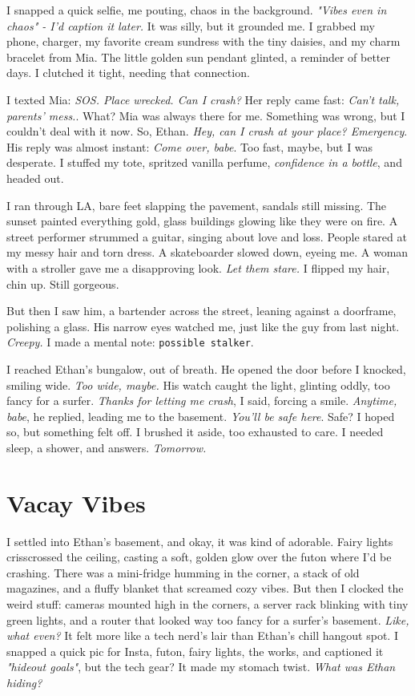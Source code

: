 \documentclass[12pt,oneside]{book} %
\newcommand{\note}[1]{\texttt{#1}}
\begin{document}
I snapped a quick selfie, me pouting, chaos in the background. \textit{"Vibes even in chaos" - I’d caption it later.} It was silly, but it grounded me. I grabbed my phone, charger, my favorite cream sundress with the tiny daisies, and my charm bracelet from Mia. The little golden sun pendant glinted, a reminder of better days. I clutched it tight, needing that connection.

I texted Mia: \textit{SOS. Place wrecked. Can I crash?} Her reply came fast: \textit{Can’t talk, parents’ mess.}. What? Mia was always there for me. Something was wrong, but I couldn’t deal with it now. So, Ethan. \textit{Hey, can I crash at your place? Emergency}. His reply was almost instant: \textit{Come over, babe}. Too fast, maybe, but I was desperate. I stuffed my tote, spritzed vanilla perfume, \textit{confidence in a bottle}, and headed out.

I ran through LA, bare feet slapping the pavement, sandals still missing. The sunset painted everything gold, glass buildings glowing like they were on fire. A street performer strummed a guitar, singing about love and loss. People stared at my messy hair and torn dress. A skateboarder slowed down, eyeing me. A woman with a stroller gave me a disapproving look. \textit{Let them stare.} I flipped my hair, chin up. Still gorgeous.

But then I saw him, a bartender across the street, leaning against a doorframe, polishing a glass. His narrow eyes watched me, just like the guy from last night. \textit{Creepy.} I made a mental note: \note{possible stalker}.

I reached Ethan’s bungalow, out of breath. He opened the door before I knocked, smiling wide. \textit{Too wide, maybe.} His watch caught the light, glinting oddly, too fancy for a surfer. \textit{Thanks for letting me crash}, I said, forcing a smile. \textit{Anytime, babe}, he replied, leading me to the basement. \textit{You’ll be safe here}. Safe? I hoped so, but something felt off. I brushed it aside, too exhausted to care. I needed sleep, a shower, and answers. \textit{Tomorrow.}

\chapter{Vacay Vibes}

I settled into Ethan’s basement, and okay, it was kind of adorable. Fairy lights crisscrossed the ceiling, casting a soft, golden glow over the futon where I’d be crashing. There was a mini-fridge humming in the corner, a stack of old magazines, and a fluffy blanket that screamed cozy vibes. But then I clocked the weird stuff: cameras mounted high in the corners, a server rack blinking with tiny green lights, and a router that looked way too fancy for a surfer’s basement. \textit{Like, what even?} It felt more like a tech nerd’s lair than Ethan’s chill hangout spot. I snapped a quick pic for Insta, futon, fairy lights, the works, and captioned it \textit{"hideout goals"}, but the tech gear? It made my stomach twist. \textit{What was Ethan hiding?}
\end{document}

